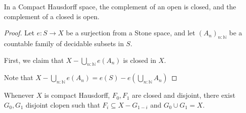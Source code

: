 \begin{lemma}
  In a Compact Hausdorff space, the complement of an open is closed, and the complement of a closed is open. 
\end{lemma}
\begin{proof}
  Let $e : S \to X$ be a surjection from a Stone space, 
  and let $(A_n)_{n:\mathbb N}$ be a countable family of decidable subsets in $S$. 

  First, we claim that 
  $X - \bigcup_{n:\mathbb N} e(A_n)$
  is closed in $X$. 

  Note that 
  $
  X - \bigcup_{n:\mathbb N} e(A_n) 
  = 
  e(S) - e(\bigcup_{n:\mathbb N} A_n)
  $

\end{proof}

\begin{lemma}
  Whenever $X$ is compact Hausdorff, $F_0, F_1$ are closed and disjoint, 
  there exist $G_0, G_1$ disjoint clopen such that 
  $F_i \subseteq X - G_{1-i}$ and $G_0 \cup G_1 = X$. 
  
\end{lemma}
